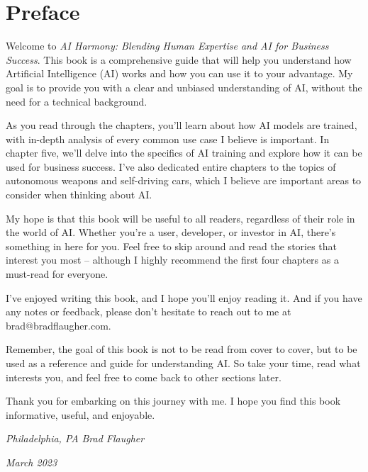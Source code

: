 \let\cleardoublepage\clearpage
\chapter*{Preface}

Welcome to \textit{AI Harmony: Blending Human Expertise and AI for Business Success}. This book is a comprehensive guide that will help you understand how Artificial Intelligence (AI) works and how you can use it to your advantage. My goal is to provide you with a clear and unbiased understanding of AI, without the need for a technical background.

As you read through the chapters, you’ll learn about how AI models are trained, with in-depth analysis of every common use case I believe is important. In chapter five, we’ll delve into the specifics of AI training and explore how it can be used for business success. I’ve also dedicated entire chapters to the topics of autonomous weapons and self-driving cars, which I believe are important areas to consider when thinking about AI.

My hope is that this book will be useful to all readers, regardless of their role in the world of AI. Whether you’re a user, developer, or investor in AI, there’s something in here for you. Feel free to skip around and read the stories that interest you most – although I highly recommend the first four chapters as a must-read for everyone.

I’ve enjoyed writing this book, and I hope you’ll enjoy reading it. And if you have any notes or feedback, please don’t hesitate to reach out to me at brad@bradflaugher.com.

Remember, the goal of this book is not to be read from cover to cover, but to be used as a reference and guide for understanding AI. So take your time, read what interests you, and feel free to come back to other sections later.

Thank you for embarking on this journey with me. I hope you find this book informative, useful, and enjoyable.

\textit{Philadelphia, PA} \hfill \textit{Brad Flaugher}

\textit{March 2023}



